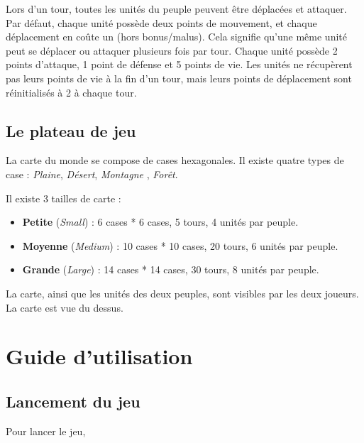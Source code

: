 Lors d'un tour, toutes les unités du peuple peuvent être déplacées et attaquer. Par défaut, chaque unité possède deux points de mouvement, et chaque déplacement en coûte un (hors bonus/malus). Cela signifie qu’une même unité peut se déplacer ou attaquer plusieurs fois par tour. Chaque unité possède 2 points d’attaque, 1 point de défense et 5 points de vie. Les unités ne récupèrent pas leurs points de vie à la fin d’un tour, mais leurs points de déplacement sont réinitialisés à 2 à chaque tour.

\subsection{Le plateau de jeu}

La carte du monde se compose de cases hexagonales. Il existe quatre types de case : \textit{Plaine}, \textit{Désert}, \textit{Montagne} , \textit{Forêt}. 

Il existe 3 tailles de carte :

\begin{itemize}

\item \textbf{Petite} (\textit{Small}) : 6 cases * 6 cases, 5 tours, 4 unités par peuple.
\item \textbf{Moyenne} (\textit{Medium}) : 10 cases * 10 cases, 20 tours, 6 unités par peuple.
\item \textbf{Grande} (\textit{Large}) : 14 cases * 14 cases, 30 tours, 8 unités par peuple.

\end{itemize}

La carte, ainsi que les unités des deux peuples, sont visibles par les deux joueurs. La carte est vue du dessus.

\section{Guide d'utilisation}

\subsection{Lancement du jeu}

Pour lancer le jeu, 

